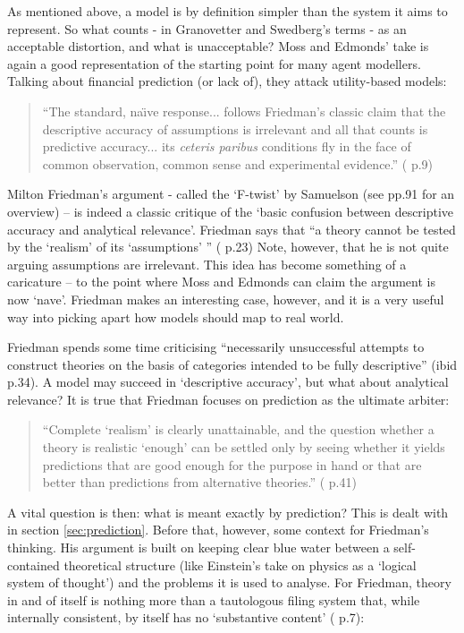 As mentioned above, a model is by definition simpler than the system it aims to represent. So what counts - in Granovetter and Swedberg's terms - as an acceptable distortion, and what is unacceptable? Moss and Edmonds' take is again a good representation of the starting point for many agent modellers. Talking about financial prediction (or lack of), they attack utility-based models: 
	
\begin{quote}
``The standard, na\"{\i}ve response... follows Friedman's classic claim that the descriptive accuracy of assumptions is irrelevant and all that counts is predictive accuracy...  its \emph{ceteris paribus} conditions fly in the face of common observation, common sense and experimental evidence.'' (\citealt{moss_towards_2005} p.9)
\end{quote}

Milton Friedman's argument - called the `F-twist' by Samuelson (see \citealt{blaug_methodology_1992} pp.91 for an overview) – is indeed a classic critique of the `basic confusion between descriptive accuracy and analytical relevance'. Friedman says that ``a theory cannot be tested by the `realism' of its `assumptions' '' (\citealt{friedman_essays_1953} p.23) Note, however, that he is not quite arguing assumptions are irrelevant. This idea has become something of a caricature – to the point where Moss and Edmonds can claim the argument is now `na\”{\i}ve'. Friedman makes an interesting case, however, and it is a very useful way into picking apart how models should map to real world. 

Friedman spends some time criticising ``necessarily unsuccessful attempts to construct theories on the basis of categories intended to be fully descriptive'' (ibid p.34). A model may succeed in `descriptive accuracy', but what about analytical relevance? It is true that Friedman focuses on prediction as the ultimate arbiter: 

\begin{quote}
``Complete `realism' is clearly unattainable, and the question whether a theory is realistic `enough' can be settled only by seeing whether it yields predictions that are good enough for the purpose in hand or that are better than predictions from alternative theories.'' (\citealt{friedman_essays_1953} p.41)
\end{quote}

A vital question is then: what is meant exactly by prediction? This is dealt with in section \ref{sec:prediction}. Before that, however, some context for Friedman's thinking. His argument is built on keeping clear blue water between a self-contained theoretical structure (like Einstein's take on physics as a `logical system of thought') and the problems it is used to analyse. For Friedman, theory in and of itself is nothing more than a tautologous filing system that, while internally consistent, by itself has no `substantive content' (\citealt{friedman_essays_1953} p.7): 

